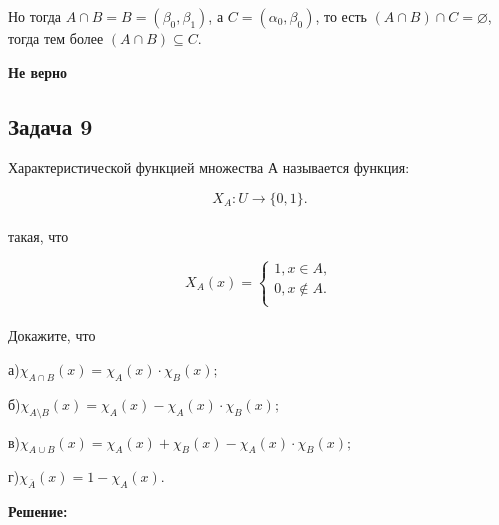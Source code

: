 \documentclass[a4paper,14pt]{article} %
\begin{document}
Но тогда $A\cap B = B = (\beta_0, \beta_1) $, а $C = (\alpha_0, \beta_0) $, то есть $(A\cap B)\cap C = \varnothing$, тогда тем более $(A\cap B)\subseteq C $.

\begin{flushright}
\begin{large}
\textbf {Не верно}
\end{large}
\end{flushright}

\begin{center}
\subsection{Задача 9}
\end{center}

 Характеристической функцией множества А называется функция:

\[ X_{A}: U \rightarrow \{0,1\} .\]\\
такая, что

\[ X_{A}(x) = \begin{cases}
1 , x\in A,\\
0 , x\notin A.\\ 
\end{cases}\]\\
Докажите, что

а)$\chi_{A\cap B}(x) = \chi_{A}(x) \cdot \chi_{B}(x);$

б)$\chi_{A\setminus B}(x) = \chi_{A}(x) - \chi_{A}(x) \cdot \chi_{B}(x);$

в)$\chi_{A\cup B}(x) = \chi_A(x) + \chi_{B}(x) - \chi_{A}(x)\cdot \chi_{B} (x);$

г)$\chi_{\overline{A}}(x) = 1 - \chi_{A}(x).$


\begin{center}
\bfseries
{\Large Решение: }
\end{center}
\end{document}
